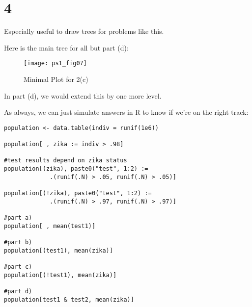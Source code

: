 \documentclass{article}
\begin{document}
\section*{4} 

Especially useful to draw trees for problems like this.

Here is the main tree for all but part (d):

\begin{figure}[htbp]
\centering
\texttt{[image: ps1\_fig07]}
\caption{Minimal Plot for 2(c)}
\label{fig:zika}
\end{figure}

In part (d), we would extend this by one more level.

As always, we can just simulate answers in R to know if we're on the right track:

\begin{lstlisting}
population <- data.table(indiv = runif(1e6))

population[ , zika := indiv > .98]

#test results depend on zika status
population[(zika), paste0("test", 1:2) :=
             .(runif(.N) > .05, runif(.N) > .05)]

population[(!zika), paste0("test", 1:2) :=
             .(runif(.N) > .97, runif(.N) > .97)]

#part a)
population[ , mean(test1)]

#part b)
population[(test1), mean(zika)]

#part c)
population[(!test1), mean(zika)]

#part d)
population[test1 & test2, mean(zika)]
\end{lstlisting}
\end{document}
